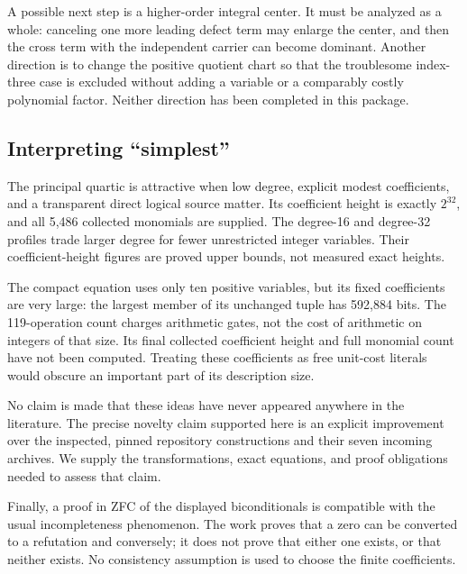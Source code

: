 A possible next step is a higher-order integral center. It must be
analyzed as a whole: canceling one more leading defect term may enlarge
the center, and then the cross term with the independent carrier can
become dominant. Another direction is to change the positive quotient
chart so that the troublesome index-three case is excluded without
adding a variable or a comparably costly polynomial factor. Neither
direction has been completed in this package.

\subsection{Interpreting ``simplest''}

The principal quartic is attractive when low degree, explicit modest
coefficients, and a transparent direct logical source matter. Its
coefficient height is exactly \(2^{32}\), and all 5,486 collected
monomials are supplied. The degree-16 and degree-32 profiles trade larger
degree for fewer unrestricted integer variables. Their coefficient-height
figures are proved upper bounds, not measured exact heights.

The compact equation uses only ten positive variables, but its fixed
coefficients are very large: the largest member of its unchanged tuple
has 592,884 bits. The 119-operation count charges arithmetic gates, not
the cost of arithmetic on integers of that size. Its final collected
coefficient height and full monomial count have not been computed.
Treating these coefficients as free unit-cost literals would obscure
an important part of its description size.

No claim is made that these ideas have never appeared anywhere in the
literature. The precise novelty claim supported here is an explicit
improvement over the inspected, pinned repository constructions and their
seven incoming archives. We supply the transformations, exact equations,
and proof obligations needed to assess that claim.

Finally, a proof in ZFC of the displayed biconditionals is compatible
with the usual incompleteness phenomenon. The work proves that a zero
can be converted to a refutation and conversely; it does not prove that
either one exists, or that neither exists. No consistency assumption is
used to choose the finite coefficients.
